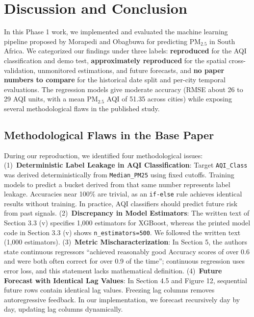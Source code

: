\section{Discussion and Conclusion}
In this Phase 1 work, we implemented and evaluated the machine learning pipeline proposed by Morapedi and Obagbuwa \cite{morapedi2023air} for predicting $\text{PM}_{2.5}$ in South Africa. We categorized our findings under three labels: \textbf{reproduced} for the AQI classification and demo test, \textbf{approximately reproduced} for the spatial cross-validation, unmonitored estimations, and future forecasts, and \textbf{no paper numbers to compare} for the historical date split and per-city temporal evaluations. The regression models give moderate accuracy (RMSE about 26 to 29 AQI units, with a mean $\text{PM}_{2.5}$ AQI of 51.35 across cities) while exposing several methodological flaws in the published study.

\subsection{Methodological Flaws in the Base Paper}
During our reproduction, we identified four methodological issues: (1)~\textbf{Deterministic Label Leakage in AQI Classification}: Target \texttt{AQI\_Class} was derived deterministically from \texttt{Median\_PM25} using fixed cutoffs. Training models to predict a bucket derived from that same number represents label leakage. Accuracies near 100\% are trivial, as an \texttt{if-else} rule achieves identical results without training. In practice, AQI classifiers should predict future risk from past signals. (2)~\textbf{Discrepancy in Model Estimators}: The written text of Section 3.3 (v) specifies 1,000 estimators for XGBoost, whereas the printed model code in Section 3.3 (v) shows \texttt{n\_estimators=500}. We followed the written text (1,000 estimators). (3)~\textbf{Metric Mischaracterization}: In Section 5, the authors state continuous regressors ``achieved reasonably good Accuracy scores of over 0.6 and were both often correct for over 0.9 of the time''; continuous regression uses error loss, and this statement lacks mathematical definition. (4)~\textbf{Future Forecast with Identical Lag Values}: In Section 4.5 and Figure 12, sequential future rows contain identical lag values. Freezing lag columns removes autoregressive feedback. In our implementation, we forecast recursively day by day, updating lag columns dynamically.

